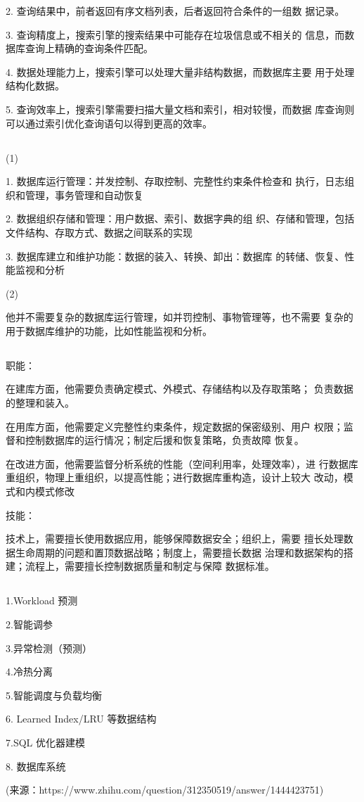 \documentclass[UTF8]{ctexart}
\begin{document}
2. 查询结果中，前者返回有序文档列表，后者返回符合条件的一组数
据记录。

3. 查询精度上，搜索引擎的搜索结果中可能存在垃圾信息或不相关的
信息，而数据库查询上精确的查询条件匹配。

4. 数据处理能力上，搜索引擎可以处理大量非结构数据，而数据库主要
用于处理结构化数据。

5. 查询效率上，搜索引擎需要扫描大量文档和索引，相对较慢，而数据
库查询则可以通过索引优化查询语句以得到更高的效率。

\subsection{}

(1)

1. 数据库运行管理：并发控制、存取控制、完整性约束条件检查和
执行，日志组织和管理，事务管理和自动恢复

2. 数据组织存储和管理：用户数据、索引、数据字典的组
织、存储和管理，包括文件结构、存取方式、数据之间联系的实现

3. 数据库建立和维护功能：数据的装入、转换、卸出：数据库
的转储、恢复、性能监视和分析

(2)

他并不需要复杂的数据库运行管理，如并罚控制、事物管理等，也不需要
复杂的用于数据库维护的功能，比如性能监视和分析。

\subsection{}

职能：

在建库方面，他需要负责确定模式、外模式、存储结构以及存取策略；
负责数据的整理和装入。

在用库方面，他需要定义完整性约束条件，规定数据的保密级别、用户
权限；监督和控制数据库的运行情况；制定后援和恢复策略，负责故障
恢复。

在改进方面，他需要监督分析系统的性能（空间利用率，处理效率），进
行数据库重组织，物理上重组织，以提高性能；进行数据库重构造，设计上较大
改动，模式和内模式修改

技能：

技术上，需要擅长使用数据应用，能够保障数据安全；组织上，需要
擅长处理数据生命周期的问题和置顶数据战略；制度上，需要擅长数据
治理和数据架构的搭建；流程上，需要擅长控制数据质量和制定与保障
数据标准。

\subsection{}

1.Workload 预测

2.智能调参

3.异常检测（预测）

4.冷热分离

5.智能调度与负载均衡

6. Learned Index/LRU 等数据结构

7.SQL 优化器建模

8. 数据库系统

(来源：https://www.zhihu.com/question/312350519/answer/1444423751)
\end{document}
